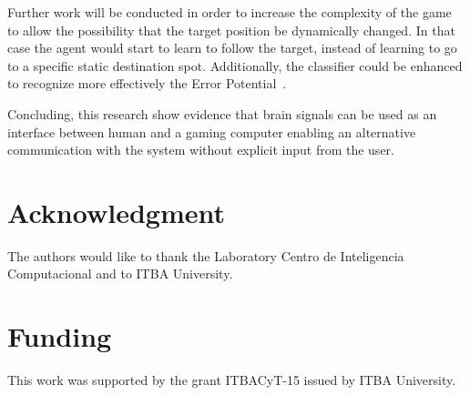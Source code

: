\documentclass[journal]{IEEEtran}
\begin{document}
{{Further work will be conducted in order to increase the complexity of the game to allow the possibility that the target position be dynamically changed.  In that case the agent would start to learn to follow the target, instead of learning to go to a specific static destination spot.  Additionally, the classifier could be enhanced to recognize more effectively the Error Potential~\cite{Iwane2017}.

Concluding, this research show evidence that brain signals can be used as an interface between human and a gaming computer enabling an alternative communication with the system without explicit input from the user.




%

\section*{Acknowledgment}

The authors would like to thank the Laboratory Centro de Inteligencia Computacional and to ITBA University.

\section*{Funding}
This work was supported by the grant ITBACyT-15 issued by ITBA University.

}}
\end{document}
